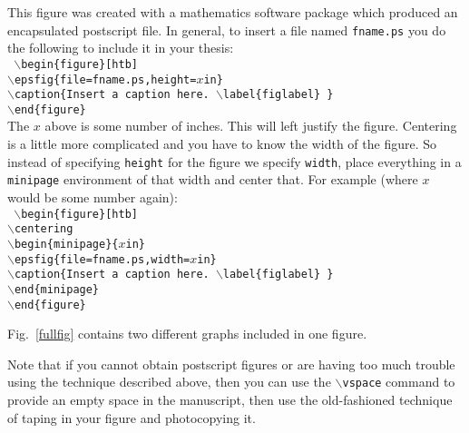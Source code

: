 This figure was created with a mathematics software package which
produced an encapsulated postscript file.  
In general, to insert  a file named {\tt fname.ps} you
do the following to include it in your thesis:
\\
{ \tt
\hspace*{0.5in} $\backslash$begin\{figure\}[htb]
\\
\hspace*{0.5in} $\backslash$epsfig\{file=fname.ps,height=$x$in\}
\\
\hspace*{0.5in} $\backslash$caption\{Insert a caption here. $\backslash$label\{figlabel\} \}
\\ 
\hspace*{0.5in} $\backslash$end\{figure\}
}
\\
The $x$ above is some number of inches.
This will left justify the figure.  Centering is
a little more complicated and you have to know the width of the figure.
So instead of specifying {\tt height} for the figure we specify
{\tt width}, place everything in a {\tt minipage} environment of that width
and center that.  For example (where $x$ would be some number again):
\\
{ \tt
\hspace*{0.5in} $\backslash$begin\{figure\}[htb]
\\
\hspace*{0.5in} $\backslash$centering
\\
\hspace*{0.5in} $\backslash$begin\{minipage\}\{$x$in\}
\\
\hspace*{0.5in} $\backslash$epsfig\{file=fname.ps,width=$x$in\}
\\
\hspace*{0.5in} $\backslash$caption\{Insert a caption here. $\backslash$label\{figlabel\} \}
\\
\hspace*{0.5in} $\backslash$end\{minipage\}
\\
\hspace*{0.5in} $\backslash$end\{figure\}
}

Fig.~\ref{fullfig} contains two different graphs included in one figure.

Note that if you cannot obtain
postscript figures or are having too much trouble using the technique
described above, then you can use the {\tt $\backslash$vspace}
command to provide an
empty space in the manuscript, then use the old-fashioned technique of
taping in your figure and photocopying it.



